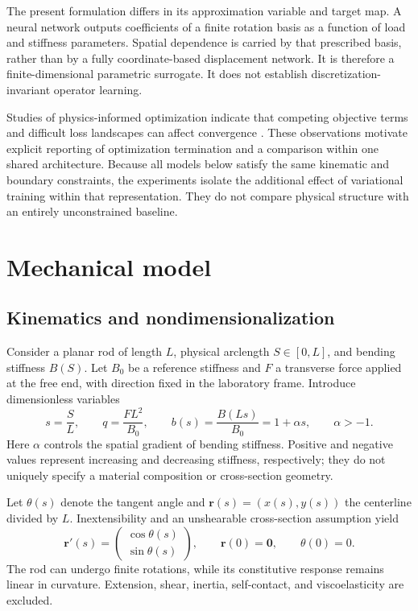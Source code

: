 \documentclass[11pt,a4paper]{article}
\begin{document}
The present formulation differs in its approximation variable and target map. A neural network outputs coefficients of a finite rotation basis as a function of load and stiffness parameters. Spatial dependence is carried by that prescribed basis, rather than by a fully coordinate-based displacement network. It is therefore a finite-dimensional parametric surrogate. It does not establish discretization-invariant operator learning.

Studies of physics-informed optimization indicate that competing objective terms and difficult loss landscapes can affect convergence \cite{wang2021,krishnapriyan2021}. These observations motivate explicit reporting of optimization termination and a comparison within one shared architecture. Because all models below satisfy the same kinematic and boundary constraints, the experiments isolate the additional effect of variational training within that representation. They do not compare physical structure with an entirely unconstrained baseline.

\section{Mechanical model}
\subsection{Kinematics and nondimensionalization}
Consider a planar rod of length $L$, physical arclength $S\in[0,L]$, and bending stiffness $B(S)$. Let $B_0$ be a reference stiffness and $F$ a transverse force applied at the free end, with direction fixed in the laboratory frame. Introduce dimensionless variables
\begin{equation}
 s=\frac{S}{L},\qquad q=\frac{FL^2}{B_0},\qquad
 b(s)=\frac{B(Ls)}{B_0}=1+\alpha s,\qquad \alpha>-1.
 \label{eq:parameters}
\end{equation}
Here $\alpha$ controls the spatial gradient of bending stiffness. Positive and negative values represent increasing and decreasing stiffness, respectively; they do not uniquely specify a material composition or cross-section geometry.

Let $\theta(s)$ denote the tangent angle and $\mathbf r(s)=(x(s),y(s))$ the centerline divided by $L$. Inextensibility and an unshearable cross-section assumption yield
\begin{equation}
 \mathbf r'(s)=\begin{pmatrix}\cos\theta(s)\\\sin\theta(s)\end{pmatrix},
 \qquad \mathbf r(0)=\mathbf 0,\qquad \theta(0)=0.
 \label{eq:kinematics}
\end{equation}
The rod can undergo finite rotations, while its constitutive response remains linear in curvature. Extension, shear, inertia, self-contact, and viscoelasticity are excluded.
\end{document}
